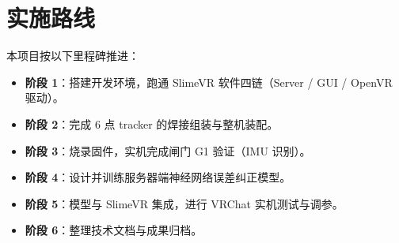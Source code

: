 \documentclass[scheme=plain,UTF8,11pt,a4paper]{ctexart}
\begin{document}
\section{实施路线}
\label{sec:roadmap}

本项目按以下里程碑推进：

\begin{itemize}
    \item \textbf{阶段 1}：搭建开发环境，跑通 SlimeVR 软件四链（Server / GUI / OpenVR 驱动）。
    \item \textbf{阶段 2}：完成 6 点 tracker 的焊接组装与整机装配。
    \item \textbf{阶段 3}：烧录固件，实机完成闸门 G1 验证（IMU 识别）。
    \item \textbf{阶段 4}：设计并训练服务器端神经网络误差纠正模型。
    \item \textbf{阶段 5}：模型与 SlimeVR 集成，进行 VRChat 实机测试与调参。
    \item \textbf{阶段 6}：整理技术文档与成果归档。
\end{itemize}
\end{document}
